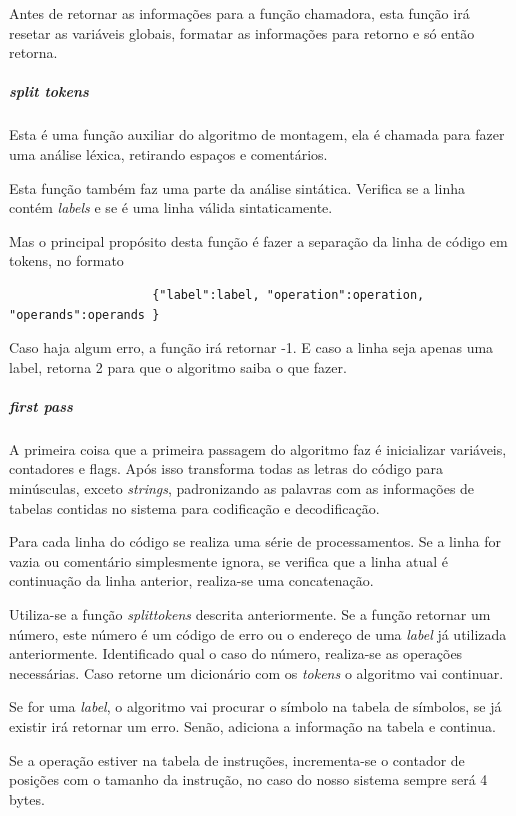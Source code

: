 				Antes de retornar as informações para a função chamadora, esta função irá resetar as variáveis globais, formatar as informações para retorno e só então retorna.

			\subparagraph{split tokens}
				Esta é uma função auxiliar do algoritmo de montagem, ela é chamada para fazer uma análise léxica, retirando espaços e comentários. 

				Esta função também faz uma parte da análise sintática. Verifica se a linha contém \textit{labels} e se é uma linha válida sintaticamente.

				Mas o principal propósito desta função é fazer a separação da linha de código em tokens, no formato

				\begin{verbatim}
					{"label":label, "operation":operation, "operands":operands }
				\end{verbatim}

				Caso haja algum erro, a função irá retornar -1. E caso a linha seja apenas uma label, retorna 2 para que o algoritmo saiba o que fazer.

			\subparagraph{first pass}						
				
				A primeira coisa que a primeira passagem do algoritmo faz é inicializar variáveis, contadores e flags. Após isso transforma todas as letras do código para minúsculas, exceto \textit{strings}, padronizando as palavras com as informações de tabelas contidas no sistema para codificação e decodificação.

				Para cada linha do código se realiza uma série de processamentos. Se a linha for vazia ou comentário simplesmente ignora, se verifica que a linha atual é continuação da linha anterior, realiza-se uma concatenação.

				Utiliza-se a função \textit{split\textunderscore tokens} descrita anteriormente. Se a função retornar um número, este número é um código de erro ou o endereço de uma \textit{label} já utilizada anteriormente. Identificado qual o caso do número, realiza-se as operações necessárias. Caso retorne um dicionário com os \textit{tokens} o algoritmo vai continuar.

				Se for uma \textit{label}, o algoritmo vai procurar o símbolo na tabela de símbolos, se já existir irá retornar um erro. Senão, adiciona a informação na tabela e continua.

				Se a operação estiver na tabela de instruções, incrementa-se o contador de posições com o tamanho da instrução, no caso do nosso sistema sempre será 4 bytes.


